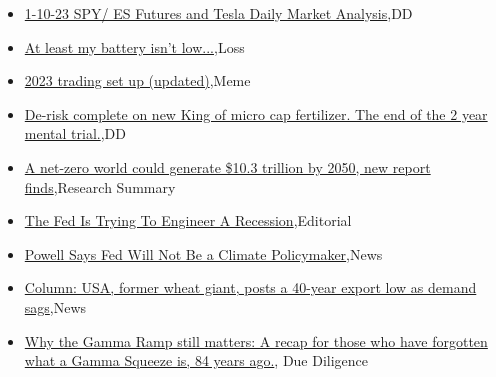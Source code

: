 \documentclass{article}%
\begin{document}
%
\begin{itemize}%
\item%
\href{https://reddit.com/r/wallstreetbets/comments/108ot66/11023\_spy\_es\_futures\_and\_tesla\_daily\_market/}{1-10-23 SPY/ ES Futures and Tesla Daily Market Analysis},DD%
\item%
\href{https://reddit.com/r/wallstreetbets/comments/108ooy9/at\_least\_my\_battery\_isnt\_low/}{At least my battery isn't low...},Loss%
\item%
\href{https://reddit.com/r/wallstreetbets/comments/108na8g/2023\_trading\_set\_up\_updated/}{2023 trading set up (updated)},Meme%
\item%
\href{https://reddit.com/r/Baystreetbets/comments/108544o/derisk\_complete\_on\_new\_king\_of\_micro\_cap/}{De-risk complete on new King of micro cap fertilizer. The end of the 2 year mental trial.},DD%
\item%
\href{https://reddit.com/r/Economics/comments/108mr0a/a\_netzero\_world\_could\_generate\_103\_trillion\_by/}{A net-zero world could generate \$10.3 trillion by 2050, new report finds},Research Summary%
\item%
\href{https://reddit.com/r/Economics/comments/108m8h9/the\_fed\_is\_trying\_to\_engineer\_a\_recession/}{The Fed Is Trying To Engineer A Recession},Editorial%
\item%
\href{https://reddit.com/r/Economics/comments/108l2se/powell\_says\_fed\_will\_not\_be\_a\_climate\_policymaker/}{Powell Says Fed Will Not Be a Climate Policymaker},News%
\item%
\href{https://reddit.com/r/Economics/comments/108hr8q/column\_usa\_former\_wheat\_giant\_posts\_a\_40year/}{Column: USA, former wheat giant, posts a 40-year export low as demand sags},News%
\item%
\href{https://reddit.com/r/Superstonk/comments/108r6a0/why\_the\_gamma\_ramp\_still\_matters\_a\_recap\_for/}{Why the Gamma Ramp still matters: A recap for those who have forgotten what a Gamma Squeeze is, 84 years ago.}, Due Diligence%
\end{itemize}%
\end{document}
